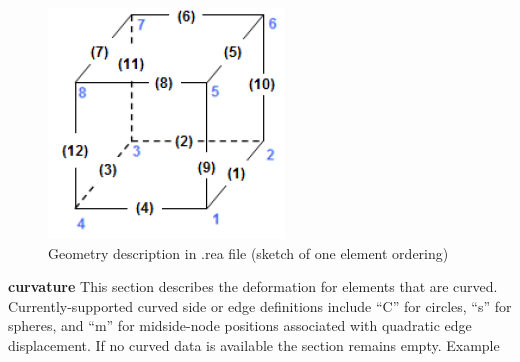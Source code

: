 \begin{description}
\begin{table}
\caption{Geometry description in .rea file}
\end{table}
\normalsize

\begin{figure}
\includegraphics[scale=0.5]{Figs/3dcube.png}
\caption{Geometry description in .rea file (sketch of one element ordering)}
\end{figure}

\item{\bf curvature} 
     This section describes the deformation for elements that are curved.
     Currently-supported curved side or edge definitions include ``C''
     for circles, ``s'' for spheres, and ``m'' for midside-node positions
     associated with quadratic edge displacement. If no curved data is available the section remains empty.
     Example
     

\end{description}
